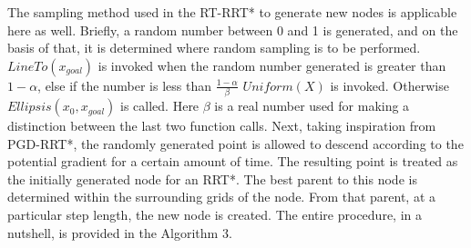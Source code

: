 \documentclass[runningheads]{llncs}
\begin{document}
The sampling method used in the RT-RRT*\cite{RT-RRT*} to generate new nodes is applicable here as well. Briefly, a random number between 0 and 1 is generated, and on the basis of that, it is determined where random sampling is to be performed. $LineTo(x_{goal})$ is invoked when the random number generated is greater than $1 - \alpha$, else if the number is less than $\frac{1-\alpha}{\beta}$  $Uniform(X)$ is invoked. Otherwise  $Ellipsis(x_{0},x_{goal})$ is called. Here $\beta$ is a real number used for making a distinction between the last two function calls. Next, taking inspiration from PGD-RRT*\cite{PG-RRT}, the randomly generated point is allowed to descend according to the potential gradient for a certain amount of time. The resulting point is treated as the initially generated node for an RRT*. The best parent to this node is determined within the surrounding grids of the node. From that parent, at a particular step length, the new node is created. The entire procedure, in a nutshell, is provided in the Algorithm 3.



\end{document}
